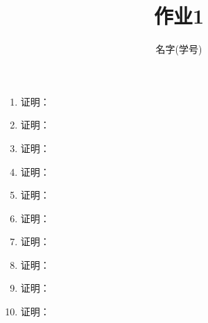 \documentclass[UTF8, a4paper, 12pt]{ctexart}
\title{作业1}
\date{}
\author{名字(学号)}
\begin{document}
\maketitle

\begin{enumerate}[label={\myenum*.}]
    \item 证明：
    \item 证明：
    \item 证明：
    \item 证明：
    \item 证明：
    \item 证明：
    \item 证明：
    \item 证明：
    \item 证明：
    \item 证明：
\end{enumerate}
\end{document}
